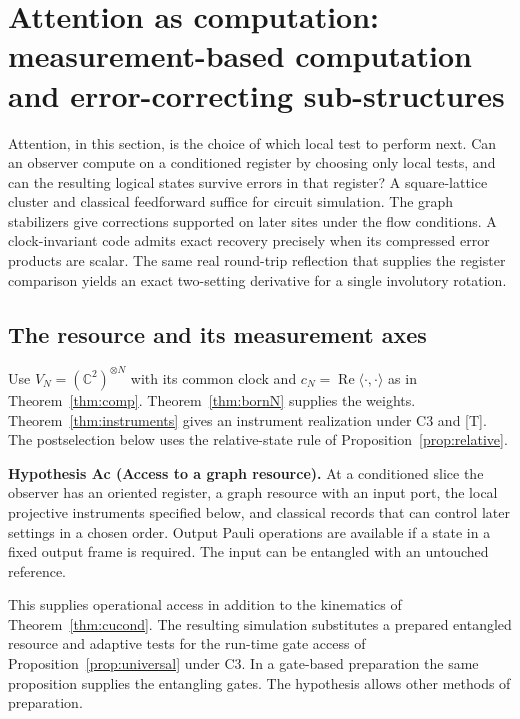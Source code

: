 \documentclass[aps,pra,onecolumn,superscriptaddress,nofootinbib,10pt]{revtex4-2}
\theoremstyle{definition}
\theoremstyle{remark}
\begin{document}
\section{Attention as computation: measurement-based computation and error-correcting sub-structures}\label{sec:attention}

Attention, in this section, is the choice of which local test to perform next.  Can an observer compute on a conditioned register by choosing only local tests, and can the resulting logical states survive errors in that register? A square-lattice cluster and classical feedforward suffice for circuit simulation. The graph stabilizers give corrections supported on later sites under the flow conditions. A clock-invariant code admits exact recovery precisely when its compressed error products are scalar. The same real round-trip reflection that supplies the register comparison yields an exact two-setting derivative for a single involutory rotation.

\subsection{The resource and its measurement axes}

Use $V_N=(\mathbb C^2)^{\otimes N}$ with its common clock and $c_N=\operatorname{Re}\langle\cdot,\cdot\rangle$ as in Theorem~\ref{thm:comp}. Theorem~\ref{thm:bornN} supplies the weights. Theorem~\ref{thm:instruments} gives an instrument realization under C3 and [T]. The postselection below uses the relative-state rule of Proposition~\ref{prop:relative}.

\smallskip\noindent\textbf{Hypothesis Ac (Access to a graph resource).}  At a conditioned slice the observer has an oriented register, a graph resource with an input port, the local projective instruments specified below, and classical records that can control later settings in a chosen order. Output Pauli operations are available if a state in a fixed output frame is required. The input can be entangled with an untouched reference.


This supplies operational access in addition to the kinematics of Theorem~\ref{thm:cucond}. The resulting simulation substitutes a prepared entangled resource and adaptive tests for the run-time gate access of Proposition~\ref{prop:universal} under C3. In a gate-based preparation the same proposition supplies the entangling gates. The hypothesis allows other methods of preparation.
\end{document}
